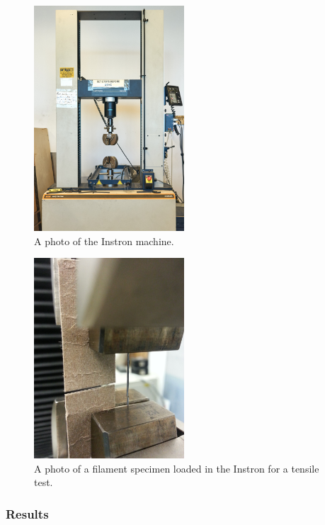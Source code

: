 \begin{figure}[h!]
    \centering
    \includegraphics[width=0.5\textwidth]{./figures/intstron-overview}
    \caption{A photo of the Instron machine.}
    \label{fig:intstron-overview}
\end{figure}

\begin{figure}[h!]
    \centering
    \includegraphics[width=0.5\textwidth]{./figures/instron-card}
    \caption{A photo of a filament specimen loaded in the Instron for a tensile test.}
    \label{fig:instron-card}
\end{figure}


\clearpage

\subsubsection{Results}

